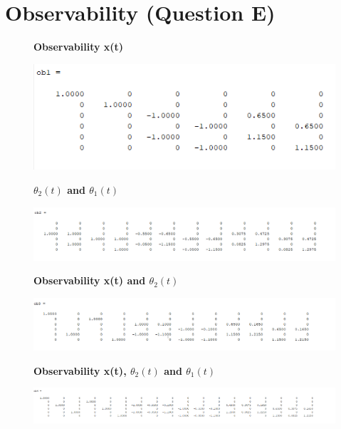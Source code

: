 \documentclass[12pt]{article}
\begin{document}
\section{Observability (Question E)}
\begin{figure}[H]
    \centering
    \textbf{Observability x(t) }\par\medskip
    \includegraphics[scale = 0.9]{c1.png}\\[0.0 cm]	%
\end{figure}

\begin{figure}[H]
    \centering
    \textbf{ $\theta_2(t)$ and $\theta_1(t)$ }\par\medskip
    \includegraphics[scale = 0.9]{c2.png}\\[0.0 cm]	%
\end{figure}

\begin{figure}[H]
    \centering
    \textbf{Observability x(t) and $\theta_2(t)$ }\par\medskip
    \includegraphics[scale = 0.6]{c3.png}\\[0.0 cm]	%
\end{figure}

\begin{figure}[H]
    \centering
    \textbf{Observability x(t), $\theta_2(t)$ and $\theta_1(t)$ }\par\medskip
    \includegraphics[scale = 0.4]{c4.png}\\[0.0 cm]	%
\end{figure}
\end{document}
